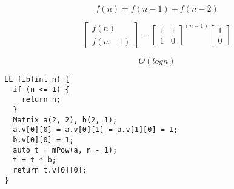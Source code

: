 $$f(n)=f(n-1)+f(n-2)$$

\begin{equation*}
    \begin{bmatrix}
        f(n) \\
        f(n - 1)
    \end{bmatrix}
    =
    \begin{bmatrix}
        1 & 1 \\
        1 & 0
    \end{bmatrix}^{(n - 1)}
    \begin{bmatrix}
        1 \\
        0
    \end{bmatrix}
\end{equation*}

$$O(logn)$$

\begin{lstlisting}
LL fib(int n) {
  if (n <= 1) {
    return n;
  }
  Matrix a(2, 2), b(2, 1);
  a.v[0][0] = a.v[0][1] = a.v[1][0] = 1;
  b.v[0][0] = 1;
  auto t = mPow(a, n - 1);
  t = t * b;
  return t.v[0][0];
}
\end{lstlisting}